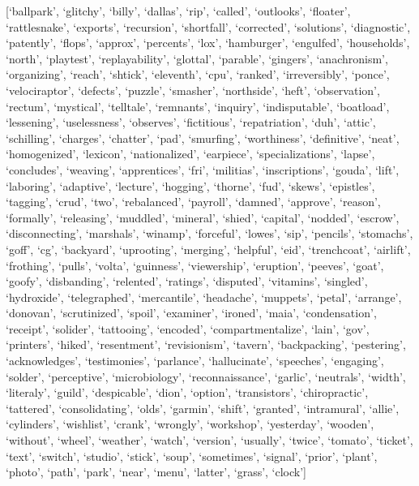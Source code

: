 \documentclass[
  12pt,
  dvipsnames,enabledeprecatedfontcommands]{scrartcl}
\begin{document}
{[}`ballpark', `glitchy', `billy', `dallas', `rip', `called',
`outlooks', `floater', `rattlesnake', `exports', `recursion',
`shortfall', `corrected', `solutions', `diagnostic', `patently',
`flops', `approx', `percents', `lox', `hamburger', `engulfed',
`households', `north', `playtest', `replayability', `glottal',
`parable', `gingers', `anachronism', `organizing', `reach', `shtick',
`eleventh', `cpu', `ranked', `irreversibly', `ponce', `velociraptor',
`defects', `puzzle', `smasher', `northside', `heft', `observation',
`rectum', `mystical', `telltale', `remnants', `inquiry', `indisputable',
`boatload', `lessening', `uselessness', `observes', `fictitious',
`repatriation', `duh', `attic', `schilling', `charges', `chatter',
`pad', `smurfing', `worthiness', `definitive', `neat', `homogenized',
`lexicon', `nationalized', `earpiece', `specializations', `lapse',
`concludes', `weaving', `apprentices', `fri', `militias',
`inscriptions', `gouda', `lift', `laboring', `adaptive', `lecture',
`hogging', `thorne', `fud', `skews', `epistles', `tagging', `crud',
`two', `rebalanced', `payroll', `damned', `approve', `reason',
`formally', `releasing', `muddled', `mineral', `shied', `capital',
`nodded', `escrow', `disconnecting', `marshals', `winamp', `forceful',
`lowes', `sip', `pencils', `stomachs', `goff', `cg', `backyard',
`uprooting', `merging', `helpful', `eid', `trenchcoat', `airlift',
`frothing', `pulls', `volta', `guinness', `viewership', `eruption',
`peeves', `goat', `goofy', `disbanding', `relented', `ratings',
`disputed', `vitamins', `singled', `hydroxide', `telegraphed',
`mercantile', `headache', `muppets', `petal', `arrange', `donovan',
`scrutinized', `spoil', `examiner', `ironed', `maia', `condensation',
`receipt', `solider', `tattooing', `encoded', `compartmentalize',
`lain', `gov', `printers', `hiked', `resentment', `revisionism',
`tavern', `backpacking', `pestering', `acknowledges', `testimonies',
`parlance', `hallucinate', `speeches', `engaging', `solder',
`perceptive', `microbiology', `reconnaissance', `garlic', `neutrals',
`width', `literaly', `guild', `despicable', `dion', `option',
`transistors', `chiropractic', `tattered', `consolidating', `olds',
`garmin', `shift', `granted', `intramural', `allie', `cylinders',
`wishlist', `crank', `wrongly', `workshop', `yesterday', `wooden',
`without', `wheel', `weather', `watch', `version', `usually', `twice',
`tomato', `ticket', `text', `switch', `studio', `stick', `soup',
`sometimes', `signal', `prior', `plant', `photo', `path', `park',
`near', `menu', `latter', `grass', `clock'{]}
\end{document}
